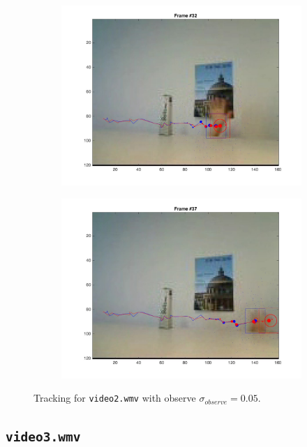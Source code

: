 \documentclass{ethz_report}
\begin{document}
\begin{figure}[h]
\begin{subfigure}[b]{.25\textwidth}
        \includegraphics[width=1\linewidth]{images/video2_observe_low_31}
    \end{subfigure}%
    \begin{subfigure}[b]{.25\textwidth}
        \centering
        \includegraphics[width=1\linewidth]{images/video2_observe_low_36}
    \end{subfigure}
    \caption{Tracking for \texttt{video2.wmv} with observe $\sigma_{observe} = 0.05$.}
    \label{fig:tracking_video2_observe_low}
\end{figure}

\subsection*{\texttt{video3.wmv}}
\end{document}
